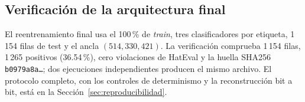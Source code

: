 \subsection{Verificación de la arquitectura final}

El reentrenamiento final usa el 100\,\% de \emph{train}, tres clasificadores por
etiqueta, 1\,154 filas de test y el ancla $(514,330,421)$. La verificación
comprueba 1\,154 filas, 1\,265 positivos (36.54\,\%), cero violaciones de
HatEval y la huella SHA256 \texttt{b0979a8a\ldots}; dos ejecuciones
independientes producen el mismo archivo. El protocolo completo, con los
controles de determinismo y la reconstrucción bit a bit, está en la
Sección~\ref{sec:reproducibilidad}.
